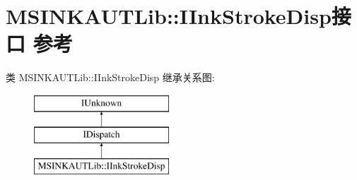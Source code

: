 \hypertarget{interface_m_s_i_n_k_a_u_t_lib_1_1_i_ink_stroke_disp}{}\section{M\+S\+I\+N\+K\+A\+U\+T\+Lib\+:\+:I\+Ink\+Stroke\+Disp接口 参考}
\label{interface_m_s_i_n_k_a_u_t_lib_1_1_i_ink_stroke_disp}
类 M\+S\+I\+N\+K\+A\+U\+T\+Lib\+:\+:I\+Ink\+Stroke\+Disp 继承关系图\+:\begin{figure}[H]
\begin{center}
\leavevmode
\includegraphics[height=3.000000cm]{interface_m_s_i_n_k_a_u_t_lib_1_1_i_ink_stroke_disp}
\end{center}
\end{figure}
